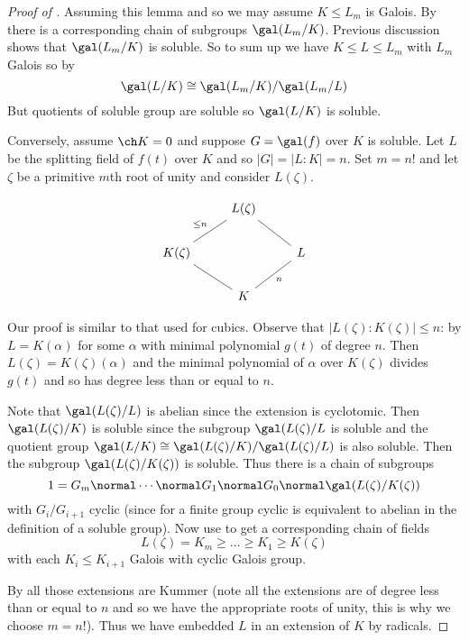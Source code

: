 \documentclass[a4paper]{article}
\begin{document}
\begin{proof}[Proof of ]
  Assuming this lemma and so we may assume \(K \leq L_m\) is Galois. By  there is a corresponding chain of subgroups \(\gal(L_m/K)\). Previous discussion shows that \(\gal(L_m/K)\) is soluble. So to sum up we have \(K \leq L \leq L_m\) with \(L_m\) Galois so by 
  \[
    \gal(L/K) \cong \gal(L_m/K)/\gal(L_m/L)
  \]
  But quotients of soluble group are soluble so \(\gal(L/K)\) is soluble.

  Conversely, assume \(\ch K = 0\) and suppose \(G = \gal(f)\) over \(K\) is soluble. Let \(L\) be the splitting field of \(f(t)\) over \(K\) and so \(|G| = |L:K| = n\). Set \(m = n!\) and let \(\zeta\) be a primitive \(m\)th root of unity and consider \(L(\zeta)\).

  \[
    \begin{tikzcd}
      & L(\zeta) \ar[dl, dash, "\leq n"'] \ar[dr, dash] & \\
      K(\zeta) \ar[dr, dash] & & L \ar[dl, dash, "n"] \\
      & K &
    \end{tikzcd}
  \]

  Our proof is similar to that used for cubics. Observe that \(|L(\zeta):K(\zeta)| \leq n\): by  \(L = K(\alpha)\) for some \(\alpha\) with minimal polynomial \(g(t)\) of degree \(n\). Then \(L(\zeta) = K(\zeta)(\alpha)\) and the minimal polynomial of \(\alpha\) over \(K(\zeta)\) divides \(g(t)\) and so has degree less than or equal to \(n\).

  Note that \(\gal(L(\zeta)/L)\) is abelian since the extension is cyclotomic. Then \(\gal(L(\zeta)/K)\) is soluble since the subgroup \(\gal(L(\zeta)/L\) is soluble and the quotient group \(\gal(L/K) \cong \gal(L(\zeta)/K)/\gal(L(\zeta)/L)\) is also soluble. Then the subgroup \(\gal(L(\zeta)/K(\zeta))\) is soluble. Thus there is a chain of subgroups
  \[
    1 = G_m \normal \cdots \normal G_1 \normal G_0 \normal \gal(L(\zeta)/K(\zeta))
  \]
  with \(G_i/G_{i + 1}\) cyclic (since for a finite group cyclic is equivalent to abelian in the definition of a soluble group). Now use  to get a corresponding chain of fields
  \[
    L(\zeta) = K_m \geq \dots \geq K_1\geq K(\zeta)
  \]
  with each \(K_i \leq K_{i + 1}\) Galois with cyclic Galois group.

  By  all those extensions are Kummer (note all the extensions are of degree less than or equal to \(n\) and so we have the appropriate roots of unity, this is why we choose \(m = n!\)). Thus we have embedded \(L\) in an extension of \(K\) by radicals.
\end{proof}
\end{document}
